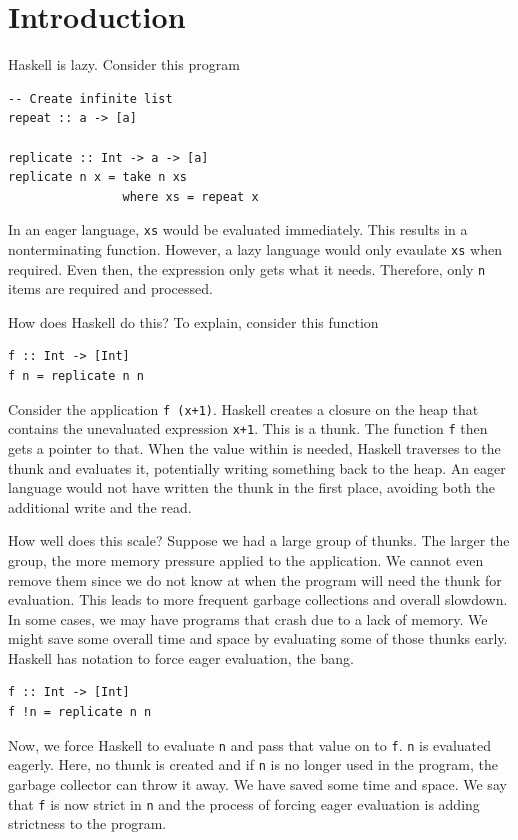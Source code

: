 \documentclass[preprint,nocopyrightspace]{sigplanconf}
\begin{document}

\section{Introduction}\label{sec:intro}

Haskell is lazy. Consider this program
\begin{lstlisting}[label={lst:repl}]
-- Create infinite list
repeat :: a -> [a]

replicate :: Int -> a -> [a]
replicate n x = take n xs
                where xs = repeat x
\end{lstlisting}
In an eager language, \lstinline!xs! would be evaluated immediately. This results in a nonterminating function. However, a lazy language would only evaulate \lstinline!xs! when required. Even then, the expression only gets what it needs. Therefore, only \lstinline!n! items are required and processed.

How does Haskell do this? To explain, consider this function
\begin{lstlisting}[label={lst:f}]
f :: Int -> [Int]
f n = replicate n n
\end{lstlisting}
Consider the application \lstinline!f (x+1)!. Haskell creates a closure on the heap that contains the unevaluated expression \lstinline!x+1!. This is a thunk. The function \lstinline!f! then gets a pointer to that. When the value within is needed, Haskell traverses to the thunk and evaluates it, potentially writing something back to the heap. An eager language would not have written the thunk in the first place, avoiding both the additional write and the read.

How well does this scale? Suppose we had a large group of thunks. The larger the group, the more memory pressure applied to the application. We cannot even remove them since we do not know at when the program will need the thunk for evaluation. This leads to more frequent garbage collections and overall slowdown. In some cases, we may have programs that crash due to a lack of memory. We might save some overall time and space by evaluating some of those thunks early. Haskell has notation to force eager evaluation, the bang.
\begin{lstlisting}[label={lst:fstrict}]
f :: Int -> [Int]
f !n = replicate n n
\end{lstlisting}

Now, we force Haskell to evaluate \lstinline!n! and pass that value on to \lstinline!f!. \lstinline{n} is evaluated eagerly. Here, no thunk is created and if \lstinline{n} is no longer used in the program, the garbage collector can throw it away. We have saved some time and space. We say that \lstinline!f! is now strict in \lstinline!n! and the process of forcing eager evaluation is adding strictness to the program.
\end{document}
